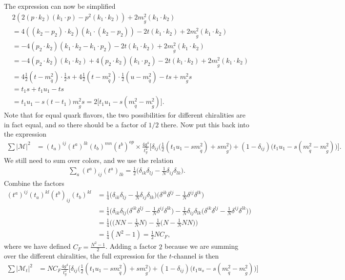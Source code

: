 \documentclass[11pt]{article}
\begin{document}
The expression can now be simplified
\begin{align*}
&2(2 (p \cdot k_2) (k_1 \cdot p) - p^2 (k_1 \cdot k_2) ) + 2m_{\tilde{g}}^2 (k_1 \cdot k_2)\\ &= 4((k_2 - p_2) \cdot k_2) (k_1 \cdot (k_2-p_2)) - 2t (k_1 \cdot k_2) + 2m_{\tilde{g}}^2 (k_1 \cdot k_2)\\
&=-4(p_2 \cdot k_2)(k_1 \cdot k_2 - k_1 \cdot p_2) - 2t(k_1 \cdot k_2) + 2m_{\tilde{g}}^2 (k_1 \cdot k_2)\\
&= -4 (p_2 \cdot k_2)(k_1 \cdot k_2) + 4(p_2 \cdot k_2)(k_1 \cdot p_2) - 2t (k_1 \cdot k_2) + 2m_{\tilde{g}}^2 (k_1 \cdot k_2)\\
&= 4 \frac{1}{2}(t-m_{\tilde{q}}^2)\cdot \frac{1}{2}s + 4 \frac{1}{2}(t-m_{\tilde{q}}^2)\cdot \frac{1}{2}(u-m_{\tilde{q}}^2)-  ts + m_{\tilde{g}}^2 s\\
&= t_1s+t_1u_1 -ts\\
&= t_1u_1 - s(t-t_1) m_{\tilde{g}}^2 s = 2 \big[t_1u_1 -s(m_{\tilde{q}}^2 - m_{\tilde{g}}^2) \big].
\end{align*}
Note that for equal quark flavors, the two possibilities for different chiralities are in fact equal, and so there should be a factor of $1/2$ there. Now put this back into the expression 
\begin{align*}
\sum |\mathcal{M}|^2 &=   (t_a)^{ij} (t^a)^{lk} (t_b)^{mn} (t^b)^{op}  \times\frac{4 g^4}{t_g^2} \Big[\delta_{ij} \big(\frac{1}{2}(t_1u_1 -sm_{\tilde{q}}^2)+  sm_{\tilde{g}}^2 \big) + (1-\delta_{ij})\big(t_1u_1 -s(m_{\tilde{q}}^2- m_{\tilde{g}}^2) \big)\Big].
\end{align*}
We still need to sum over colors, and we use the relation \cite{ellis2003qcd}
\begin{align*}
\sum_a (t^a)_{ij}(t^a)_{lk} = \frac{1}{2} \big(\delta_{ik} \delta_{lj} - \frac{1}{N} \delta_{ij} \delta_{lk} \big).
\end{align*}
Combine the factors
\begin{align*}
(t^a)^{ij}(t_a)^{kl}(t^b)_{ij}(t_b)^{kl} &= \frac{1}{4} 
\big(\delta_{ik} \delta_{lj} - \frac{1}{N} \delta_{ij} \delta_{lk} \big)
\big(\delta^{ik} \delta^{lj} - \frac{1}{N} \delta^{ij} \delta^{lk} \big)\\
&= \frac{1}{4} \Big(\delta_{ik} \delta_{lj}\big(\delta^{ik} \delta^{lj} - \frac{1}{N} \delta^{ij} \delta^{lk} \big) - \frac{1}{N} \delta_{ij} \delta_{lk}\big(\delta^{ik} \delta^{lj} - \frac{1}{N} \delta^{ij} \delta^{lk} \big) \Big)\\
&= \frac{1}{4} \Big(\big(N N - \frac{1}{N} N \big)  - \frac{1}{N} \big(N - \frac{1}{N} N N \big) \Big)\\
&= \frac{1}{4} (N^2 - 1) = \frac{1}{2}NC_F,
\end{align*}
where we have defined $C_F = \frac{N^2 -1}{2}$. Adding a factor $2$ because we are summing over the different chiralities, the full expression for the $t$-channel is then
\begin{align*}
\sum |\mathcal{M}_t|^2 &= NC_F \frac{4g^4}{t_g^2} \Big[ \delta_{ij} \big(\frac{1}{2}(t_1u_1-sm_{\tilde{q}}^2) + sm_{\tilde{g}}^2 \big) + (1-\delta_{ij}) \big(t_1u_s - s(m_{\tilde{q}}^2 - m_{\tilde{g}}^2) \big)\Big]
\end{align*}
\end{document}
